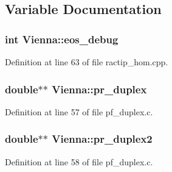\subsection{Variable Documentation}
\hypertarget{namespace_vienna_a24d3b842931ab2ed27b801a9ea14b77f}{
\subsubsection[{eos\+\_\+debug}]{\setlength{\rightskip}{0pt plus 5cm}int Vienna\+::eos\+\_\+debug}}\label{namespace_vienna_a24d3b842931ab2ed27b801a9ea14b77f}


Definition at line 63 of file ractip\+\_\+hom.\+cpp.

\hypertarget{namespace_vienna_a8238d1b2f4301ad0ed67a7e02c3bb4e3}{
\subsubsection[{pr\+\_\+duplex}]{\setlength{\rightskip}{0pt plus 5cm}double$\ast$$\ast$ Vienna\+::pr\+\_\+duplex}}\label{namespace_vienna_a8238d1b2f4301ad0ed67a7e02c3bb4e3}


Definition at line 57 of file pf\+\_\+duplex.\+c.

\hypertarget{namespace_vienna_af212193cb67ebca5f87d42c4ab9e0196}{
\subsubsection[{pr\+\_\+duplex2}]{\setlength{\rightskip}{0pt plus 5cm}double$\ast$$\ast$ Vienna\+::pr\+\_\+duplex2}}\label{namespace_vienna_af212193cb67ebca5f87d42c4ab9e0196}


Definition at line 58 of file pf\+\_\+duplex.\+c.


